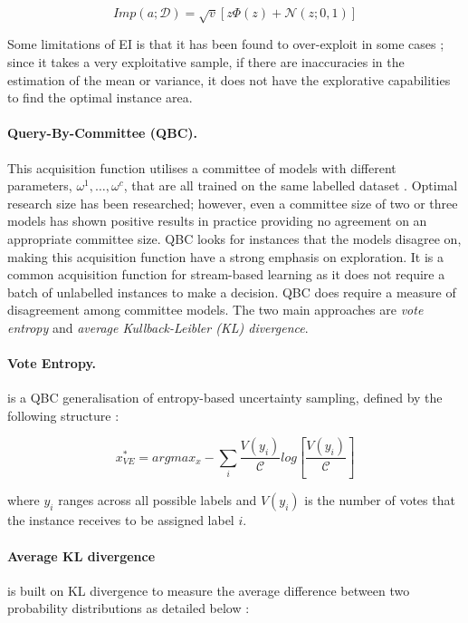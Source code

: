 \documentclass[ %
                    author={James Stephenson},
                supervisor={Dr. Edwin Simpson},
                    degree={MSc},
                     title={PROJECT PLAN},
                  subtitle={ Bayesian Deep Learning For Extractive Test Summarisation},
                      type={},
                      year={2022}]{../additions/dissertation}
\begin{document}
				$$
					Imp(a; \mathcal{D}) = \sqrt{v}\left[z \Phi(z) + \mathcal{N}(z; 0, 1)\right]
				$$	

				\noindent
				Some limitations of EI is that it has been found to over-exploit in some cases \cite{Qin17}; since it takes a very exploitative sample, if there are inaccuracies in the estimation of the mean or variance, it does not have the explorative capabilities to find the optimal instance area.

				\paragraph{Query-By-Committee (QBC).} This acquisition function utilises a committee of models with different parameters, ${\omega^1, \ldots, \omega^{c}}$, that are all trained on the same labelled dataset \cite{Seung92}. Optimal research size has been researched; however, even a committee size of two or three models has shown positive results in practice \cite{Seung92, Craven08, Nigam98} providing no agreement on an appropriate committee size. QBC looks for instances that the models disagree on, making this acquisition function have a strong emphasis on exploration. It is a common acquisition function for stream-based learning \cite{Settles09} as it does not require a batch of unlabelled instances to make a decision. QBC does require a measure of disagreement among committee models. The two main approaches are \emph{vote entropy} and \emph{average Kullback-Leibler (KL) divergence}. 

				\paragraph{Vote Entropy.} is a QBC generalisation of entropy-based uncertainty sampling, defined by the following structure \cite{Dagan95}:

				$$
					x^\ast_{VE} = argmax_x - \sum_i \frac{V(y_i)}{\mathcal{C}} log \left[\frac{V(y_i)}{\mathcal{C}}\right]
				$$
		
				\noindent
				where $y_i$ ranges across all possible labels and $V(y_i)$ is the number of votes that the instance receives to be assigned label $i$.

				\paragraph{Average KL divergence} is built on KL divergence \cite{Kullback51} to measure the average difference between two probability distributions as detailed below \cite{Nigam98}:
\end{document}
